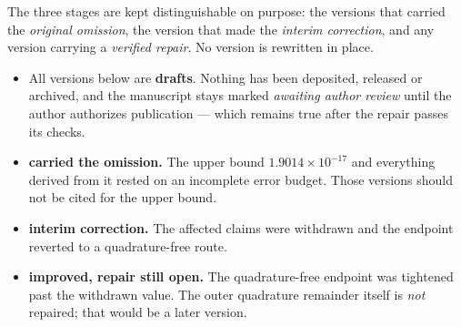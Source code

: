 \documentclass[11pt,a4paper]{article}
\theoremstyle{definition}
\theoremstyle{remark}
\begin{document}
The three stages are kept distinguishable on purpose: the versions that carried
the \emph{original omission}, the version that made the \emph{interim
correction}, and any version carrying a \emph{verified repair}. No version is
rewritten in place.

\begin{itemize}
\item[\textbf{status}] All versions below are \textbf{drafts}. Nothing has been
  deposited, released or archived, and the manuscript stays marked
  \emph{awaiting author review} until the author authorizes publication ---
  which remains true after the repair passes its checks.
\item[\textbf{1.0.x}] \textbf{carried the omission.} The upper bound
  $1.9014\times10^{-17}$ and everything derived from it rested on an incomplete
  error budget. Those versions should not be cited for the upper bound.
\item[\textbf{1.1.0}] \textbf{interim correction.} The affected claims were
  withdrawn and the endpoint reverted to a quadrature-free route.
\item[\textbf{1.2.0}] \textbf{improved, repair still open.} The
  quadrature-free endpoint was tightened past the withdrawn value. The outer
  quadrature remainder itself is \emph{not} repaired; that would be a later
  version.
\end{itemize}
\end{document}
